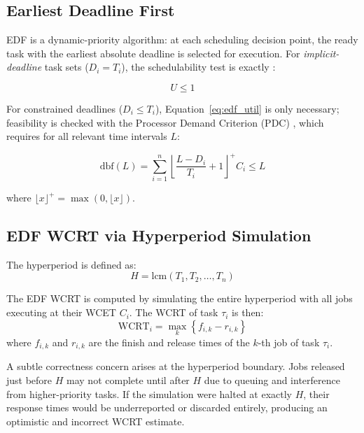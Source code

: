 \documentclass[12pt,a4paper]{article}
\begin{document}
\subsection{Earliest Deadline First}

EDF is a dynamic-priority algorithm: at each scheduling decision point, the ready task with the earliest absolute deadline is selected for execution. For \emph{implicit-deadline} task sets (\(D_i = T_i\)), the schedulability test is exactly \cite{liu1973}:

\begin{equation}
    U \leq 1
    \label{eq:edf_util}
\end{equation}

For constrained deadlines (\(D_i \leq T_i\)), Equation~\ref{eq:edf_util} is only necessary; feasibility is checked with the Processor Demand Criterion (PDC) \cite{baruah1990}, which requires for all relevant time intervals \(L\):

\begin{equation}
    \text{dbf}(L) = \sum_{i=1}^{n} \left\lfloor \frac{L - D_i}{T_i} + 1 \right\rfloor^{+} C_i \leq L
    \label{eq:pdc}
\end{equation}

where \(\lfloor x \rfloor^{+} = \max(0, \lfloor x \rfloor)\).

\subsection{EDF WCRT via Hyperperiod Simulation}

The hyperperiod is defined as:
\begin{equation}
    H = \text{lcm}(T_1, T_2, \ldots, T_n)
    \label{eq:hyperperiod}
\end{equation}

The EDF WCRT is computed by simulating the entire hyperperiod with all jobs executing at their WCET \(C_i\). The WCRT of task \(\tau_i\) is then:
\begin{equation}
    \text{WCRT}_i = \max_{k} \left\{ f_{i,k} - r_{i,k} \right\}
    \label{eq:wcrt}
\end{equation}
where \(f_{i,k}\) and \(r_{i,k}\) are the finish and release times of the \(k\)-th job of task \(\tau_i\).

A subtle correctness concern arises at the hyperperiod boundary. Jobs released just before \(H\) may not complete until after \(H\) due to queuing and interference from higher-priority tasks. If the simulation were halted at exactly \(H\), their response times would be underreported or discarded entirely, producing an optimistic and incorrect WCRT estimate.
\end{document}
